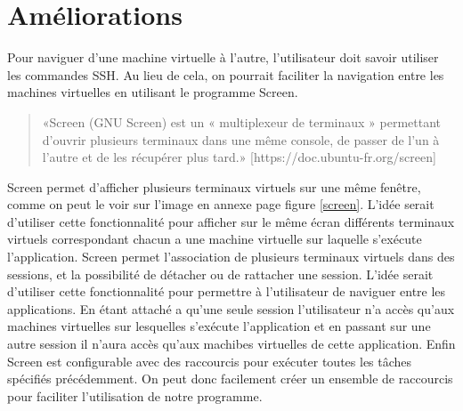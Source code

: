 \documentclass{report}
\begin{document}
    \section{Améliorations}

    Pour naviguer d'une machine virtuelle à l'autre, l'utilisateur doit savoir utiliser les commandes SSH.
    Au lieu de cela, on pourrait faciliter la navigation entre les machines virtuelles en utilisant le programme Screen.
    \begin{quote}
        «Screen (GNU Screen) est un « multiplexeur de terminaux » permettant d'ouvrir plusieurs terminaux dans une même console, de passer de l'un à l'autre et de les récupérer plus tard.»
        [https://doc.ubuntu-fr.org/screen]
    \end{quote}
    Screen permet d'afficher plusieurs terminaux virtuels sur une même fenêtre, comme on peut le voir sur l'image en annexe page \pageref{screen} figure \ref{screen}.
    L'idée serait d'utiliser cette fonctionnalité pour afficher sur le même écran différents terminaux virtuels correspondant chacun a une machine virtuelle sur laquelle s'exécute l'application.
    Screen permet l'association de plusieurs terminaux virtuels dans des sessions, et la possibilité de détacher ou de rattacher une session.
    L'idée serait d'utiliser cette fonctionnalité pour permettre à l'utilisateur de naviguer entre les applications. En étant attaché a qu'une seule session l'utilisateur n'a accès qu'aux machines virtuelles sur lesquelles s'exécute l'application et en passant  sur une autre session il n'aura accès qu'aux machibes virtuelles de cette application.
    Enfin Screen est configurable avec des raccourcis pour exécuter toutes les tâches spécifiés précédemment. On peut donc facilement créer un ensemble de raccourcis pour faciliter l'utilisation de notre programme.\bigbreak
\end{document}
